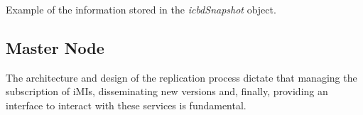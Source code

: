 \begin{listing}[ht]
\inputminted{python}{./Chapters/Code/cap4_icbdSnapshot.py}
\caption{Example of the information stored in the \textit{icbdSnapshot} object.}
\label{listing:impl_icbdSnapshot}
\end{listing}



\subsection{Master Node}
\label{sub:impl_icbdrep_master_node}





The architecture and design of the replication process dictate that managing the subscription of iMIs, disseminating new versions and, finally, providing an interface to interact with these services is fundamental. 

